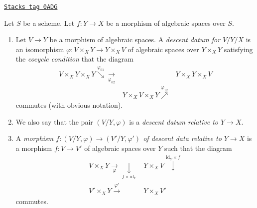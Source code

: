 \begin{definition}
\label{spaces-descent-definition-descent-datum}
\href{https://stacks.math.columbia.edu/tag/0ADG}{\texttt{Stacks tag 0ADG}}

Let $S$ be a scheme. Let $f : Y \to X$ be a morphism of algebraic spaces
over $S$.
\begin{enumerate}
\item Let $V \to Y$ be a morphism of algebraic spaces.
A {\it descent datum for $V/Y/X$} is an isomorphism
$\varphi : V \times_X Y \to Y \times_X V$ of algebraic spaces over
$Y \times_X Y$ satisfying the {\it cocycle condition} that the diagram
$$
\begin{array}{ccc}V \times_X Y \times_X Y \overset{\varphi_{01}}{\searrow}\underset{\varphi_{02}}{\longrightarrow} &  & Y \times_X Y \times_X V \\  & Y \times_X V \times_X Y \overset{\varphi_{12}}{\nearrow} & \end{array}
$$
commutes (with obvious notation).
\item We also say that the pair $(V/Y, \varphi)$ is
a {\it descent datum relative to $Y \to X$}.
\item A {\it morphism $f : (V/Y, \varphi) \to (V'/Y, \varphi')$ of
descent data relative to $Y \to X$} is a morphism
$f : V \to V'$ of algebraic spaces over $Y$ such that
the diagram
$$
\begin{array}{cc}V \times_X Y \underset{\varphi}{\longrightarrow}\underset{f \times \text{id}_Y}{\downarrow} & Y \times_X V \overset{\text{id}_Y \times f}{\downarrow} \\ V' \times_X Y \overset{\varphi'}{\longrightarrow} & Y \times_X V'\end{array}
$$
commutes.
\end{enumerate}
\end{definition}


